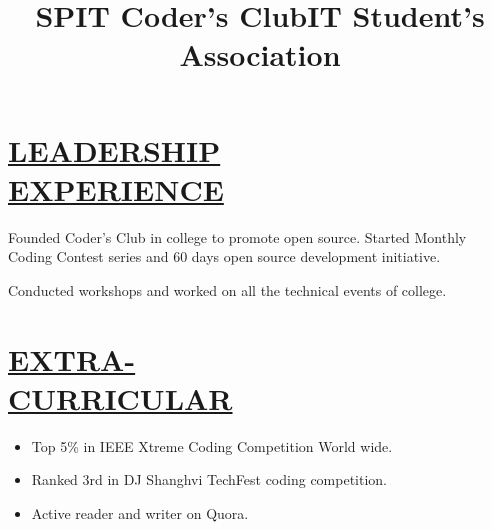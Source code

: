 \documentclass[margin]{res}
\begin{document}
\begin{resume}
\section{\underline{LEADERSHIP}\\
\underline{EXPERIENCE}}
\title{\textbf{SPIT Coder's Club}}
\begin{position}
Founded Coder's Club in college to promote open source. Started Monthly Coding Contest series and 60 days open source development initiative.
\end{position}
\vspace{-5mm}
\title{\textbf{IT Student's Association}}
\begin{position}
Conducted workshops and worked on all the technical events of college.
\end{position}

\vspace{-5mm}
\section{\underline{EXTRA-} \\
\underline{CURRICULAR }}
\begin{itemize}
\item Top 5\% in IEEE Xtreme Coding Competition World wide.
\item Ranked 3rd in DJ Shanghvi TechFest coding competition.
\item Active reader and writer on Quora. 
\end{itemize}

\end{resume}
\end{document}

